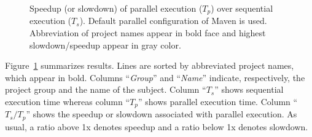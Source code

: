 \begin{figure}[h!]
\centering
{}
\caption{Speedup (or slowdown) of parallel execution ($T_p$) over
  sequential execution ($T_s$).  Default parallel configuration of
  Maven is used.  Abbreviation of project names appear in bold face
  and highest slowdown/speedup appear in gray color.}
\label{tab:speedup}
\end{figure}

Figure~\ref{tab:speedup} summarizes results.  Lines are sorted by
abbreviated project names, which appear in bold.  Columns
``\emph{Group}'' and ``\emph{Name}'' indicate, respectively, the
project group and the name of the subject.  Column ``$T_s$'' shows
sequential execution time whereas column ``$T_p$'' shows parallel
execution time. Column ``$T_s/T_p$'' shows the speedup or slowdown
associated with parallel execution.   As usual, a ratio
above 1x denotes speedup and a ratio below 1x denotes slowdown.

